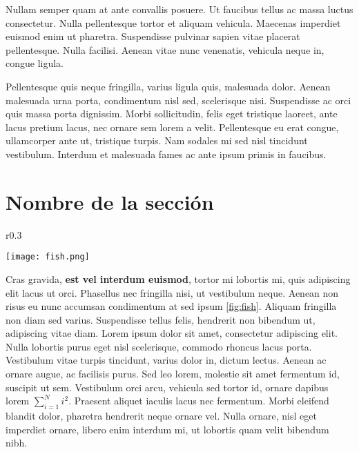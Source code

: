 \documentclass[10pt]{article}
\begin{document}
Nullam semper quam at ante convallis posuere. Ut faucibus tellus ac massa luctus consectetur. Nulla pellentesque tortor et aliquam vehicula. Maecenas imperdiet euismod enim ut pharetra. Suspendisse pulvinar sapien vitae placerat pellentesque. Nulla facilisi. Aenean vitae nunc venenatis, vehicula neque in, congue ligula.

Pellentesque quis neque fringilla, varius ligula quis, malesuada dolor. Aenean malesuada urna porta, condimentum nisl sed, scelerisque nisi. Suspendisse ac orci quis massa porta dignissim. Morbi sollicitudin, felis eget tristique laoreet, ante lacus pretium lacus, nec ornare sem lorem a velit. Pellentesque eu erat congue, ullamcorper ante ut, tristique turpis. Nam sodales mi sed nisl tincidunt vestibulum. Interdum et malesuada fames ac ante ipsum primis in faucibus.


\section{Nombre de la sección}

\begin{wrapfigure}{r}{0.3\textwidth} %
   \begin{center}
      \texttt{[image: fish.png]}
   \end{center}
   \caption{Fish.}
   \label{fig:fish}
\end{wrapfigure}

Cras gravida, \textbf{est vel interdum euismod}, tortor mi lobortis mi, quis adipiscing elit lacus ut orci. Phasellus nec fringilla nisi, ut vestibulum neque. Aenean non risus eu nunc accumsan condimentum at sed ipsum \ref{fig:fish}.
Aliquam fringilla non diam sed varius. Suspendisse tellus felis, hendrerit non bibendum ut, adipiscing vitae diam. Lorem ipsum dolor sit amet, consectetur adipiscing elit. Nulla lobortis purus eget nisl scelerisque, commodo rhoncus lacus porta. Vestibulum vitae turpis tincidunt, varius dolor in, dictum lectus. Aenean ac ornare augue, ac facilisis purus. Sed leo lorem, molestie sit amet fermentum id, suscipit ut sem. Vestibulum orci arcu, vehicula sed tortor id, ornare dapibus lorem $\sum_{i=1}^{N}{i^2}$. Praesent aliquet iaculis lacus nec fermentum. Morbi eleifend blandit dolor, pharetra hendrerit neque ornare vel. Nulla ornare, nisl eget imperdiet ornare, libero enim interdum mi, ut lobortis quam velit bibendum nibh.
\end{document}
